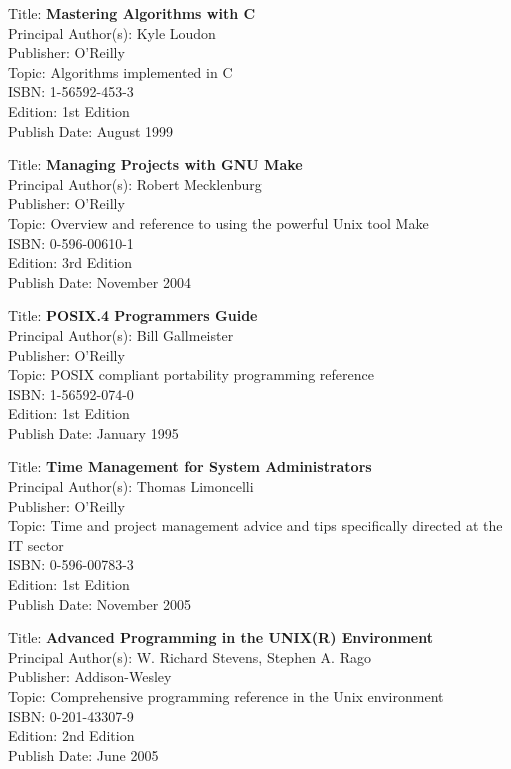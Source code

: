 Title: 	\textbf{Mastering Algorithms with C}	\\
Principal Author(s): 	Kyle Loudon  \\
Publisher:	O'Reilly	\\	
Topic:		Algorithms implemented in C \\
ISBN:			1-56592-453-3 \\
Edition:		1st Edition \\
Publish Date:		August 1999


Title: 	\textbf{Managing Projects with GNU Make}	\\
Principal Author(s): 	Robert Mecklenburg  \\
Publisher:	O'Reilly	\\	
Topic:		Overview and reference to using the powerful Unix tool Make \\
ISBN:			0-596-00610-1 \\
Edition:		3rd Edition \\
Publish Date:		November 2004

	
Title: 	\textbf{POSIX.4 Programmers Guide}	\\
Principal Author(s): 	Bill Gallmeister  \\
Publisher:	O'Reilly	\\	
Topic:		POSIX compliant portability programming reference \\
ISBN:			1-56592-074-0 \\
Edition:		1st Edition \\
Publish Date:		January 1995

	
Title: 	\textbf{Time Management for System Administrators}	\\
Principal Author(s): 	Thomas Limoncelli  \\
Publisher:	O'Reilly	\\	
Topic:		Time and project management advice and tips specifically directed at the IT sector \\
ISBN:			0-596-00783-3 \\
Edition:		1st Edition \\
Publish Date:		November 2005

	
Title: 	\textbf{Advanced Programming in the UNIX(R) Environment}	\\
Principal Author(s): 	W. Richard Stevens, Stephen A. Rago  \\
Publisher:	Addison-Wesley	\\	
Topic:		Comprehensive programming reference in the Unix environment \\
ISBN:			0-201-43307-9 \\
Edition:		2nd Edition \\
Publish Date:		June 2005


